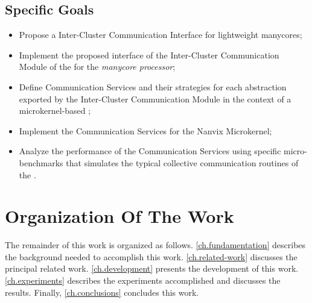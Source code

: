 \subsection{Specific Goals}
\label{sec.goals.specific}

	\begin{itemize}
		\item Propose a Inter-Cluster Communication Interface for
		lightweight manycores;
		
		\item Implement the proposed interface of the Inter-Cluster
		Communication Module of the \hal for the \textit{\mppa manycore
			processor};
		
		\item Define Communication Services and their strategies for
		each abstraction exported by the Inter-Cluster Communication
		Module in the context of a microkernel-based \os;
		
		\item Implement the Communication Services for the Nanvix
		Microkernel;

		\item Analyze the performance of the Communication Services
		using specific micro-benchmarks that simulates the typical
		collective communication routines of the \mpi.
	\end{itemize}

\section{Organization Of The Work}
\label{sec.organization}
	
	The remainder of this work is organized as follows.
	\autoref{ch.fundamentation} describes the background needed to
	accomplish this work.  \autoref{ch.related-work} discusses the
	principal related work.  \autoref{ch.development} presents the
	development of this work.  \autoref{ch.experiments} describes the
	experiments accomplished and discusses the results.  Finally,
	\autoref{ch.conclusions} concludes this work.
